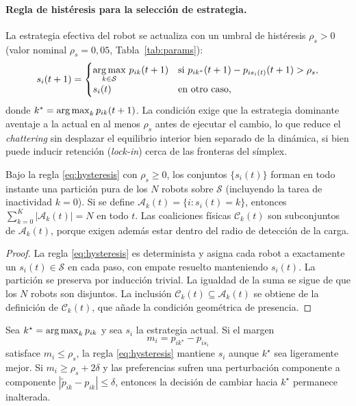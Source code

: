 \paragraph{Regla de histéresis para la selección de estrategia.}
La estrategia efectiva del robot se actualiza con un umbral de histéresis
$\rho_s > 0$ (valor nominal $\rho_s = 0{,}05$, Tabla~\ref{tab:params}):
\begin{equation}
  s_i(t+1) = \begin{cases}
    \displaystyle\operatorname*{arg\,max}_{k \in \mathcal{S}}\, p_{ik}(t+1) &
      \text{si } p_{ik^*}(t+1) - p_{i s_i(t)}(t+1) > \rho_s, \\
    s_i(t) & \text{en otro caso,}
  \end{cases}
  \label{eq:hysteresis}
\end{equation}
donde $k^* = \operatorname*{arg\,max}_k p_{ik}(t+1)$. La condición exige que la estrategia dominante
aventaje a la actual en al menos $\rho_s$ antes de ejecutar el cambio, lo que reduce
el \emph{chattering} sin desplazar el equilibrio interior bien separado de la dinámica,
si bien puede inducir retención (\emph{lock-in}) cerca de las fronteras del símplex.

\begin{lema}
\label{lema:factibilidad}
Bajo la regla \eqref{eq:hysteresis} con $\rho_s \geq 0$, los conjuntos $\{s_i(t)\}$
forman en todo instante una partición pura de los $N$ robots sobre $\mathcal{S}$
(incluyendo la tarea de inactividad $k=0$). Si se define
$\mathcal{A}_k(t)=\{i:s_i(t)=k\}$, entonces
$\sum_{k=0}^K |\mathcal{A}_k(t)| = N$ en todo $t$. Las coaliciones físicas
$\mathcal{C}_k(t)$ son subconjuntos de $\mathcal{A}_k(t)$, porque exigen además estar
dentro del radio de detección de la carga.
\end{lema}
\begin{proof}
La regla \eqref{eq:hysteresis} es determinista y asigna cada robot a exactamente un
$s_i(t) \in \mathcal{S}$ en cada paso, con empate resuelto manteniendo $s_i(t)$.
La partición se preserva por inducción trivial. La igualdad de la suma se sigue
de que los $N$ robots son disjuntos. La inclusión
$\mathcal{C}_k(t)\subseteq\mathcal{A}_k(t)$ se obtiene de la definición de
$\mathcal{C}_k(t)$, que añade la condición geométrica de presencia.
\end{proof}

\begin{lema}
\label{lema:histeresis_margen}
Sea $k^\star=\operatorname*{arg\,max}_k p_{ik}$ y sea $s_i$ la estrategia actual. Si el margen
\[
  m_i=p_{ik^\star}-p_{is_i}
\]
satisface $m_i\le\rho_s$, la regla \eqref{eq:hysteresis} mantiene $s_i$ aunque
$k^\star$ sea ligeramente mejor. Si $m_i\ge\rho_s+2\delta$ y las preferencias sufren
una perturbación componente a componente $|\tilde p_{ik}-p_{ik}|\le\delta$, entonces
la decisión de cambiar hacia $k^\star$ permanece inalterada.
\end{lema}

